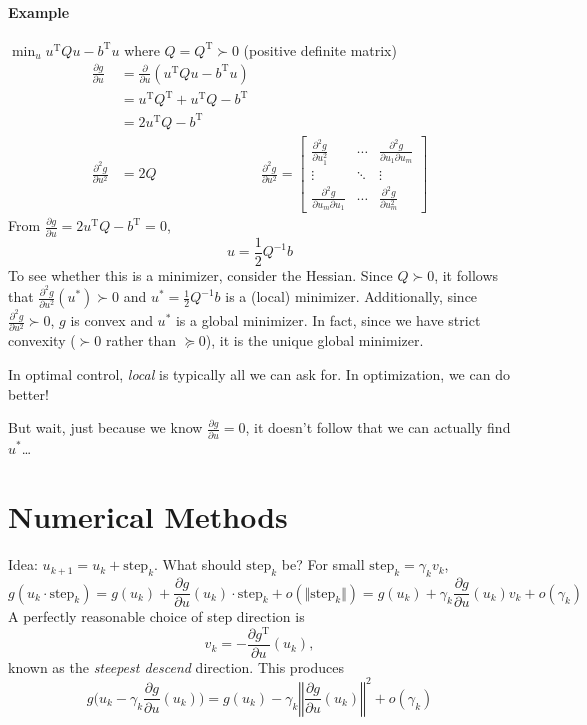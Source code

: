 \documentclass[letterpaper,12pt,titlepage]{report}
\newcommand{\trans}{^\text{T}}
\newcommand*\pder[2]{\frac{\partial #1}{\partial #2}}
\theoremstyle{plain}
\theoremstyle{definition}
\begin{document}
\paragraph{Example} $\displaystyle \min_u u\trans Q u - b\trans u$ where $Q=Q\trans\succ 0$ (positive definite matrix)
\begin{align}
  \pder{g}{u} &= \pder{}{u} (u\trans Qu - b\trans u) \\
              &= u\trans Q\trans + u\trans Q - b\trans \\
              &= 2u\trans Q - b\trans \\[-3ex]
  \pder{^2 g}{u^2} &= 2Q
              & \pder{^2 g}{u^2} = \begin{bmatrix}
                \pder{^2 g}{u_1^2} & \cdots & \pder{^2 g}{u_1 \partial u_m} \\
                \vdots & \ddots & \vdots \\
                \pder{^2 g}{u_m \partial u_1} & \cdots & \pder{^2 g}{u_m^2}
              \end{bmatrix}
\end{align}
From $\pder{g}{u} = 2u\trans Q-b\trans = 0$,
\[ u = \frac12 Q^{-1} b \]
To see whether this is a minimizer, consider the Hessian. Since $Q \succ 0$, it follows that $\pder{^2 g}{u^2} (u^*) \succ 0$ and $u^*=\frac12 Q^{-1} b$ is a (local) minimizer. Additionally, since $\pder{^2 g}{u^2} \succ 0$, $g$ is convex and $u^*$ is a global minimizer. In fact, since we have strict convexity ($\succ 0$ rather than $\succeq 0$), it is the unique global minimizer.

In optimal control, \emph{local} is typically all we can ask for. In optimization, we can do better!

But wait, just because we know $\pder{g}{u}=0$, it doesn't follow that we can actually find $u^*$\dots

\section{Numerical Methods}
Idea: $u_{k+1}=u_k+\text{step}_k$. What should $\text{step}_k$ be? For small $\text{step}_k=\gamma_k v_k$,
\[ g(u_k \cdot \text{step}_k) = g(u_k) + \pder{g}{u}(u_k) \cdot \text{step}_k + o(\Vert \text{step}_k \Vert) = g(u_k) + \gamma_k \pder{g}{u}(u_k) v_k + o(\gamma_k) \]
A perfectly reasonable choice of step direction is
\[ v_k=-\pder{g\trans}{u}(u_k), \]
known as the \emph{steepest descend} direction. This produces
\[ g \Big( u_k - \gamma_k\pder{g}{u}(u_k) \Big) = g(u_k) - \gamma_k \left\Vert \pder{g}{u}(u_k) \right\Vert^2 + o(\gamma_k) \]
\end{document}
